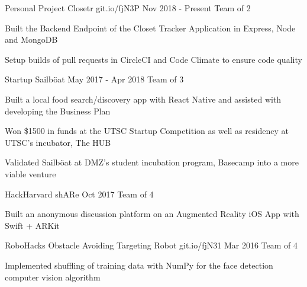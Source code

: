 \begin{cventries}
\cventry
    {Personal Project}
    {Closetr}
    {git.io/fjN3P}
    {Nov 2018 - Present}
    {Team of 2}
    {
      \begin{cvitems}
        \item{Built the Backend Endpoint of the Closet Tracker Application in Express, Node and MongoDB}
        \item{Setup builds of pull requests in CircleCI and Code Climate to ensure code quality}
      \end{cvitems}
    }
\cventry
  {Startup}
  {Sailböat}
  {}
  {May 2017 - Apr 2018}
  {Team of 3}
  {
    \begin{cvitems}
      \item {Built a local food search/discovery app with React Native and assisted with developing the Business Plan}
      \item {Won \$1500 in funds at the UTSC Startup Competition as well as residency at UTSC's incubator, The HUB}
      \item {Validated Sailböat at DMZ's student incubation program, Basecamp into a more viable venture}
    \end{cvitems}
  }
\cventry
  {HackHarvard}
  {shARe}
  {}
  {Oct 2017}
  {Team of 4}
  {
    \begin{cvitems}
      \item {Built an anonymous discussion platform on an Augmented Reality iOS App with Swift + ARKit}
    \end{cvitems}
  }
\cventry
  {RoboHacks}
  {Obstacle Avoiding Targeting Robot}
  {git.io/fjN31}
  {Mar 2016}
  {Team of 4}
  {
    \begin{cvitems}
      \item {Implemented shuffling of training data with NumPy for the face detection computer vision algorithm}
    \end{cvitems}
  }
\end{cventries}
